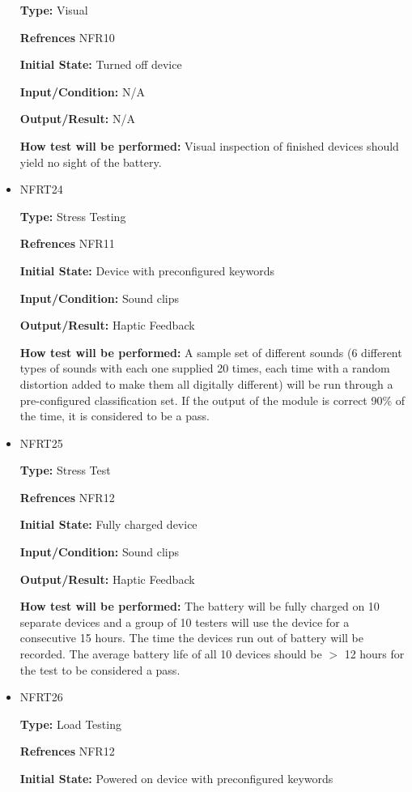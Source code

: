 \documentclass[12pt, titlepage]{article}
\begin{document}
\begin{itemize}
\textbf{Type:} Visual

\textbf{Refrences} NFR10
					
\textbf{Initial State:} Turned off device
					
\textbf{Input/Condition:} N/A
					
\textbf{Output/Result:} N/A
					
\textbf{How test will be performed:} Visual inspection of finished devices should yield no sight of the battery.

\item{NFRT24}

\textbf{Type:} Stress Testing

\textbf{Refrences} NFR11
					
\textbf{Initial State:} Device with preconfigured keywords 
					
\textbf{Input/Condition:} Sound clips
					
\textbf{Output/Result:} Haptic Feedback
					
\textbf{How test will be performed:} A sample set of different sounds (6 different types of sounds with each one supplied 20 times, each time with a random distortion added to make them all digitally different) will be run through a pre-configured classification set. If the output of the module is correct 90\% of the time, it is considered to be a pass.

\item{NFRT25}

\textbf{Type:} Stress Test

\textbf{Refrences} NFR12
					
\textbf{Initial State:} Fully charged device
					
\textbf{Input/Condition:} Sound clips
					
\textbf{Output/Result:} Haptic Feedback
					
\textbf{How test will be performed:} The battery will be fully charged on 10 separate devices and a group of 10  testers will use the device for a consecutive 15 hours. The time the devices run out of battery will be recorded. The average battery life of all 10 devices should be 	$>$ 12 hours for the test to be considered a pass.

\item{NFRT26}

\textbf{Type:} Load Testing 

\textbf{Refrences} NFR12
					
\textbf{Initial State:} Powered on device with preconfigured keywords 
					

\end{itemize}
\end{document}
